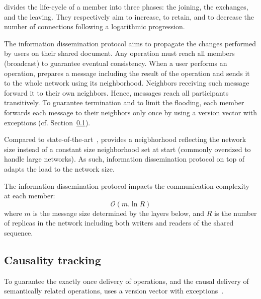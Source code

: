 \begin{asparadesc}
  \SPRAY divides the life-cycle of a member into three phases: the joining, the
  exchanges, and the leaving. They respectively aim to increase, to retain, and
  to decrease the number of connections following a logarithmic progression.

\item [The information dissemination protocol]\cite{birman1999bimodal} aims to
  propagate the changes performed by users on their shared document. Any
  operation must reach all members (broadcast) to guarantee eventual
  consistency.  When a user performs an operation, \CRATE prepares a message
  including the result of the operation and sends it to the whole network using
  its neighborhood. Neighbors receiving such message forward it to their own
  neighbors. Hence, messages reach all participants transitively. To guarantee
  termination and to limit the flooding, each member forwards each message to
  their neigbhors only once by using a version vector with exceptions
  (cf. Section~\ref{subsec:causality}).

  Compared to state-of-the-art~\cite{ganesh2003peer, jelasity2007gossip,
    voulgaris2005cyclon}, \SPRAY provides a neigbhorhood reflecting the network
  size instead of a constant size neighborhood set at start (commonly oversized
  to handle large networks). As such, information dissemination protocol on top
  of \SPRAY adapts the load to the network size.

  The information dissemination protocol impacts the communication complexity at
  each member:
  \begin{equation}
    \mathcal{O}(m.\ln R)
  \end{equation}
  where $m$ is the message size determined by the layers below, and
  $R$ is the number of replicas in the network including both
  writers and readers of the shared sequence.
\end{asparadesc}

\subsection{Causality tracking}
\label{subsec:causality}

To guarantee the exactly once delivery of operations, and the causal delivery of
semantically related operations, \CRATE uses a version vector with
exceptions~\cite{malkhi2007concise, mukund2014optimized}.

